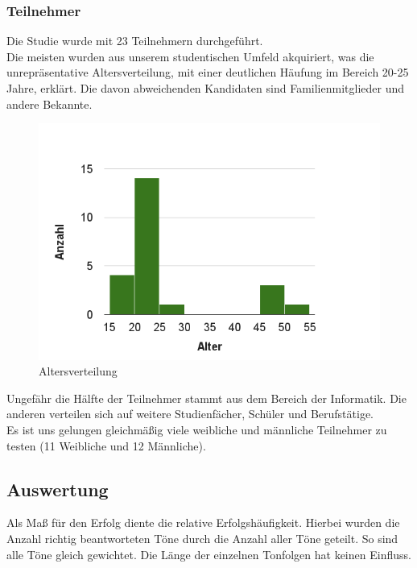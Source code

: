\documentclass{acm_proc_article-sp}
\begin{document}
\subsubsection{Teilnehmer}
Die Studie wurde mit 23 Teilnehmern durchgeführt.\\
Die meisten wurden aus unserem studentischen Umfeld akquiriert, was die unrepräsentative Altersverteilung, mit einer deutlichen Häufung im Bereich 20-25 Jahre, erklärt. Die davon abweichenden Kandidaten sind Familienmitglieder und andere Bekannte.
\begin{figure}[H]
\includegraphics[width=1.0\linewidth]{Abbildungen/Altersverteilung.png}
\caption{Altersverteilung}
\label{Alter}
\end{figure}
Ungefähr die Hälfte der Teilnehmer stammt aus dem Bereich der Informatik. Die anderen verteilen sich auf weitere Studienfächer, Schüler und Berufstätige.\\
Es ist uns gelungen gleichmäßig viele weibliche und männliche Teilnehmer zu testen (11 Weibliche und 12 Männliche). 
\subsection{Auswertung}
Als Maß für den Erfolg diente die relative Erfolgshäufigkeit. Hierbei wurden die Anzahl richtig beantworteten Töne durch die Anzahl aller Töne geteilt. So sind alle Töne gleich gewichtet. Die Länge der einzelnen Tonfolgen hat keinen Einfluss.
\end{document}
